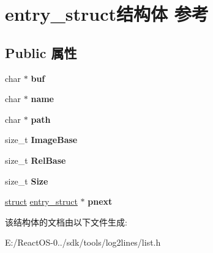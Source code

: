 \hypertarget{structentry__struct}{}\section{entry\+\_\+struct结构体 参考}
\label{structentry__struct}
\subsection*{Public 属性}
\begin{DoxyCompactItemize}
\item 
\mbox{\label{structentry__struct_a4568cdb1b41642c6d648863a45d4b7ff}} 
char $\ast$ {\bfseries buf}
\item 
\mbox{\label{structentry__struct_aee767db51e2f54298a6196318767bfc5}} 
char $\ast$ {\bfseries name}
\item 
\mbox{\label{structentry__struct_a7e2b70e1575655c51dbb3866c78f1006}} 
char $\ast$ {\bfseries path}
\item 
\mbox{\label{structentry__struct_a028a320740053f170e048f4a7652647a}} 
size\+\_\+t {\bfseries Image\+Base}
\item 
\mbox{\label{structentry__struct_ab15680a8d26be5d405bdc8263b4c3b13}} 
size\+\_\+t {\bfseries Rel\+Base}
\item 
\mbox{\label{structentry__struct_a251b115dad897cdcd36e5656760289da}} 
size\+\_\+t {\bfseries Size}
\item 
\mbox{\label{structentry__struct_a0f34b9e7ef1d5591a45f380f0b598d0d}} 
\hyperlink{interfacestruct}{struct} \hyperlink{structentry__struct}{entry\+\_\+struct} $\ast$ {\bfseries pnext}
\end{DoxyCompactItemize}


该结构体的文档由以下文件生成\+:\begin{DoxyCompactItemize}
\item 
E\+:/\+React\+O\+S-\/0../sdk/tools/log2lines/list.\+h\end{DoxyCompactItemize}
